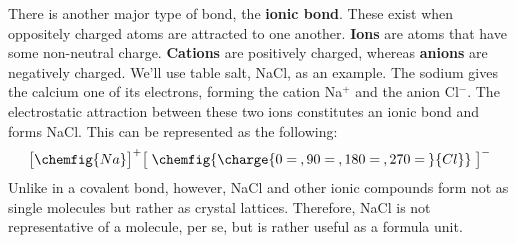 \documentclass{article}
\begin{document}
There is another major type of bond, the \textbf{ionic bond}. These exist when oppositely charged atoms are attracted to one another. \textbf{Ions} are atoms that have some non-neutral charge. \textbf{Cations} are positively charged, whereas \textbf{anions} are negatively charged. We'll use table salt, NaCl, as an example. The sodium gives the calcium one of its electrons, forming the cation Na\(^+\) and the anion Cl\(^-\). The electrostatic attraction between these two ions constitutes an ionic bond and forms NaCl. This can be represented as the following:
\[ \big[ \chemfig{Na}\big]^+\big[\;\chemfig{\charge{0=\:,90=\:,180=\:,270=\:}{Cl}}\;\big]^-\]
Unlike in a covalent bond, however, NaCl and other ionic compounds form not as single molecules but rather as crystal lattices. Therefore, NaCl is not representative of a molecule, per se, but is rather useful as a formula unit.\par
\end{document}
